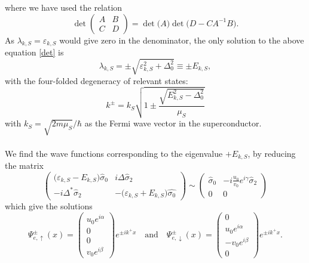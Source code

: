 where we have used the relation 
\begin{equation}
\det\begin{pmatrix}
A & B \\ C & D
\end{pmatrix}
= \det\big(A\big)\det\big(D-CA^{-1}B\big).
\end{equation}
As $\lambda_{k,S} = \varepsilon_{k,S}$ would give zero in the denominator, the only solution to the above equation \eqref{det} is
\begin{equation}
\lambda_{k,S} = \pm\sqrt{\varepsilon_{k,S}^2 + \Delta_0^2} \equiv \pm E_{k,S},
\end{equation}
with the four-folded degeneracy of relevant states:
\begin{equation}
k^{\pm} = k_S \sqrt{1 \pm \frac{\sqrt{E_{k,S}^2 - \Delta_0^2}}{\mu_S}}
\end{equation}
with $k_S = \sqrt{2m\mu_S}/\hbar$ as the Fermi wave vector in the superconductor. 
\\
\\
We find the wave functions corresponding to the eigenvalue $+E_{k,S}$, by reducing the matrix
\begin{equation}
\begin{pmatrix}
\big(\varepsilon_{k,S} - E_{k,S}\big) \hat{\sigma}_0 & i\Delta\hat{\sigma}_2 \\
-i\Delta^*\hat{\sigma}_2 & -\big(\varepsilon_{k,S} + E_{k,S}\big)\hat{\sigma_0}  
\end{pmatrix}
\sim
\begin{pmatrix}
\hat{\sigma}_0 & -i\frac{u_0}{v_0}e^{i\gamma}\hat{\sigma}_2 \\
0 & 0
\end{pmatrix}
\end{equation}
which give the solutions
\begin{equation}
    \Psi^{\pm}_{e,\uparrow}(x) = 
    \begin{pmatrix}
        u_0e^{i\alpha} \\ 0 \\ 0 \\ v_0e^{i\beta}
    \end{pmatrix}e^{\pm ik^+x}
    \quad \mathrm{and} \quad 
    \Psi^{\pm}_{e,\downarrow}(x) = 
    \begin{pmatrix}
        0 \\ u_0e^{i\alpha} \\ -v_0e^{i\beta}\\0
    \end{pmatrix}e^{\pm ik^+x}.
\end{equation}
